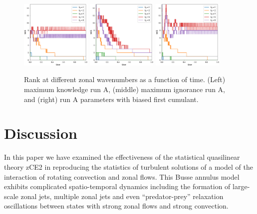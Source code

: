 \documentclass{jfm}
\begin{document}
\begin{figure}
    \centering
    \includegraphics[width=0.3\textwidth]{fig6_left.eps}
    \includegraphics[width=0.3\textwidth]{fig6_cent.eps}
    \includegraphics[width=0.3\textwidth]{fig6_right.eps}
    \caption{Rank at different zonal wavenumbers as a function of time. (Left) maximum knowledge run A, (middle) maximum ignorance run A, and (right) run A parameters with biased first cumulant.}
    \label{fig:rank_runs}
\end{figure}

\section{Discussion}
\label{sec:discussion}

In this paper we have examined the effectiveness of the statistical quasilinear theory zCE2 in reproducing the statistics of turbulent solutions of a model of the interaction of rotating convection and zonal flows. This Busse annulus model exhibits complicated spatio-temporal dynamics including the formation of large-scale zonal jets, multiple zonal jets and even ``predator-prey'' relaxation oscillations between states with strong zonal flows and strong convection.
\end{document}
